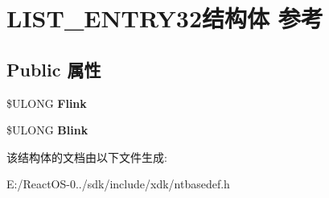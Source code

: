 \hypertarget{struct_l_i_s_t___e_n_t_r_y32}{}\section{L\+I\+S\+T\+\_\+\+E\+N\+T\+R\+Y32结构体 参考}
\label{struct_l_i_s_t___e_n_t_r_y32}
\subsection*{Public 属性}
\begin{DoxyCompactItemize}
\item 
\mbox{\label{struct_l_i_s_t___e_n_t_r_y32_a49fc0fb544d044bef7b8113f0a88dd5e}} 
\$U\+L\+O\+NG {\bfseries Flink}
\item 
\mbox{\label{struct_l_i_s_t___e_n_t_r_y32_a1d408d0c6c80a7b17bd6e6ef122e1ed4}} 
\$U\+L\+O\+NG {\bfseries Blink}
\end{DoxyCompactItemize}


该结构体的文档由以下文件生成\+:\begin{DoxyCompactItemize}
\item 
E\+:/\+React\+O\+S-\/0../sdk/include/xdk/ntbasedef.\+h\end{DoxyCompactItemize}
